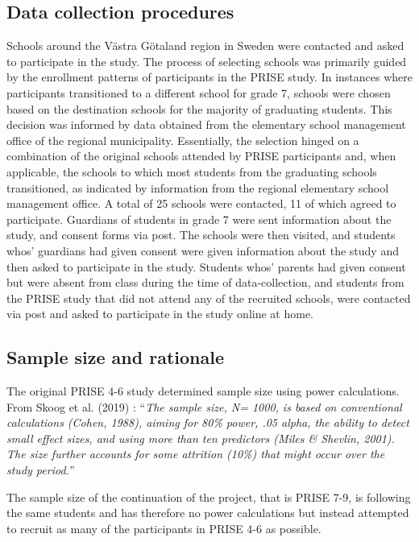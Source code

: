 \documentclass[
]{article}
\begin{document}
\subsection{Data collection
procedures}\label{data-collection-procedures}

Schools around the Västra Götaland region in Sweden were contacted and
asked to participate in the study. The process of selecting schools was
primarily guided by the enrollment patterns of participants in the PRISE
study. In instances where participants transitioned to a different
school for grade 7, schools were chosen based on the destination schools
for the majority of graduating students. This decision was informed by
data obtained from the elementary school management office of the
regional municipality. Essentially, the selection hinged on a
combination of the original schools attended by PRISE participants and,
when applicable, the schools to which most students from the graduating
schools transitioned, as indicated by information from the regional
elementary school management office. A total of 25 schools were
contacted, 11 of which agreed to participate. Guardians of students in
grade 7 were sent information about the study, and consent forms via
post. The schools were then visited, and students whos' guardians had
given consent were given information about the study and then asked to
participate in the study. Students whos' parents had given consent but
were absent from class during the time of data-collection, and students
from the PRISE study that did not attend any of the recruited schools,
were contacted via post and asked to participate in the study online at
home.

\subsection{Sample size and rationale}\label{sample-size-and-rationale}

The original PRISE 4-6 study determined sample size using power
calculations. From Skoog et al. (2019) : ``\emph{The sample size, N=
1000, is based on conventional calculations (Cohen, 1988), aiming for
80\% power, .05 alpha, the ability to detect small effect sizes, and
using more than ten predictors (Miles \& Shevlin, 2001). The size
further accounts for some attrition (10\%) that might occur over the
study period.''}

The sample size of the continuation of the project, that is PRISE 7-9,
is following the same students and has therefore no power calculations
but instead attempted to recruit as many of the participants in PRISE
4-6 as possible.
\end{document}
